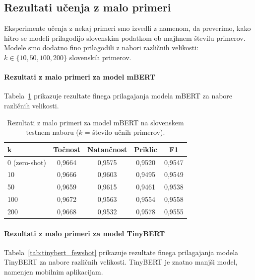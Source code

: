 \documentclass[sigconf,nonacm]{acmart}
\begin{document}
\subsection{Rezultati učenja z malo primeri}

Eksperimente učenja z nekaj primeri smo izvedli z namenom, da preverimo, kako hitro se modeli prilagodijo slovenskim podatkom ob majhnem številu primerov. Modele smo dodatno fino prilagodili z nabori različnih velikosti: $k \in \{10, 50, 100, 200\}$ slovenskih primerov.

\paragraph{Rezultati z malo primeri za model mBERT}

Tabela~\ref{tab:mbert_fewshot} prikazuje rezultate finega prilagajanja modela mBERT za nabore različnih velikosti.

\begin{table}[h]
\centering
\caption{Rezultati z malo primeri za model mBERT na slovenskem testnem naboru ($k$ = število učnih primerov).}
\label{tab:mbert_fewshot}
\begin{tabular}{lcccc}
\toprule
\textbf{k} & \textbf{Točnost} & \textbf{Natančnost} & \textbf{Priklic} & \textbf{F1} \\
\midrule
0 (zero-shot) & 0,9664 & 0,9575 & 0,9520 & 0,9547 \\
10 & 0,9666 & 0,9603 & 0,9495 & 0,9549 \\
50 & 0,9659 & 0,9615 & 0,9461 & 0,9538 \\
100 & 0,9672 & 0,9563 & 0,9554 & 0,9558 \\
200 & 0,9668 & 0,9532 & 0,9578 & 0,9555 \\
\bottomrule
\end{tabular}
\end{table}

\newpage

\paragraph{Rezultati z malo primeri za model TinyBERT}

Tabela~\ref{tab:tinybert_fewshot} prikazuje rezultate finega prilagajanja modela TinyBERT za nabore različnih velikosti. TinyBERT je znatno manjši model, namenjen mobilnim aplikacijam.
\end{document}
